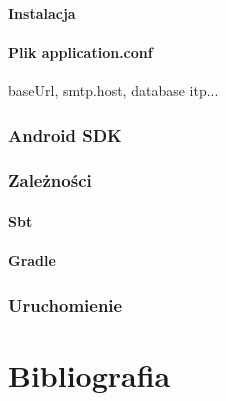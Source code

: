 \documentclass[11pt]{aghdpl}
\begin{document}
\subsubsection{Instalacja}
\subsubsection{Plik application.conf}
baseUrl, smtp.host, database itp...
\subsection{Android SDK}
\subsection{Zależności}
\subsubsection{Sbt}
\subsubsection{Gradle}
\subsection{Uruchomienie}

% 
% 

\chapter{Bibliografia} %
\label{cha:bibliografia}



%
%
%
%
\end{document}

